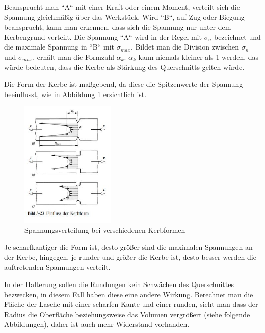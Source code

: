 			\newpage

	Beansprucht man “A“ mit einer Kraft oder einem Moment, verteilt sich die Spannung gleichmäßig über das Werkstück.
	Wird “B“, auf Zug oder Biegung beansprucht, kann man erkennen, dass sich die Spannung nur unter dem Kerbengrund verteilt.
	Die Spannung “A“ wird in der Regel mit $\sigma_{n}$ bezeichnet und die maximale Spannung in “B“ mit $\sigma_{max}$.
	Bildet man die Division zwischen $\sigma_{n}$ und $\sigma_{max}$, erhält man die Formzahl $\alpha_{k}$.
	$\alpha_{k}$ kann niemals kleiner als 1 werden, das würde bedeuten, dass die Kerbe als Stärkung des Querschnitts gelten würde.

	Die Form der Kerbe ist maßgebend, da diese die Spitzenwerte der Spannung beeinflusst, wie in Abbildung \ref{kerbform} ersichtlich ist.

			\begin{figure}[H]
			\begin{centering}
			\includegraphics[width = 0.4\textwidth]{Bilder/kerbform}
			\par\end{centering}
			\caption[Spannungsverteilung bei verschiedenen Kerbformen]{Spannungsverteilung bei verschiedenen Kerbformen\cite{kerbformen}}
			\label{kerbform}
			\end{figure}

	Je scharfkantiger die Form ist, desto größer sind die maximalen Spannungen an der Kerbe, hingegen, je runder und größer die Kerbe ist, desto besser werden die auftretenden Spannungen verteilt.

	In der Halterung sollen die Rundungen kein Schwächen des Querschnittes bezwecken, in diesem Fall haben diese eine andere Wirkung.
	Berechnet man die Fläche der Lasche mit einer scharfen Kante und einer runden,
	sieht man dass der Radius die Oberfläche beziehungsweise das Volumen vergrößert (siehe folgende Abbildungen), daher ist auch mehr Widerstand vorhanden.

